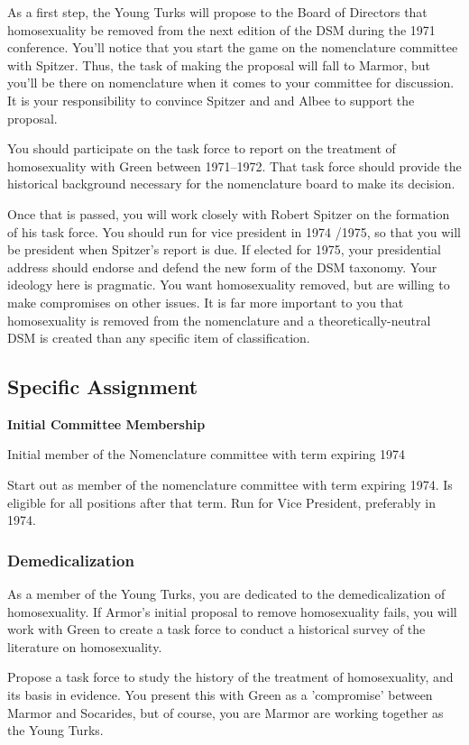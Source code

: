 \begin{refsection}
As a first step, the Young Turks will propose to the Board of Directors that homosexuality be removed from the next edition of the DSM during the 1971 conference. You'll notice that you start the game on the nomenclature committee with Spitzer. Thus, the task of making the proposal will fall to Marmor, but you'll be there on nomenclature when it comes to your committee for discussion. It is your responsibility to convince Spitzer and and Albee to support the proposal.

You should participate on the task force to report on the treatment of homosexuality with Green between 1971--1972. That task force should provide the historical background necessary for the nomenclature board to make its decision.

Once that is passed, you will work closely with Robert Spitzer on the formation of his task force. You should run for vice president in 1974 \slash  1975, so that you will be president when Spitzer's report is due. If elected for 1975, your presidential address should endorse and defend the new form of the DSM taxonomy. Your ideology here is pragmatic. You want homosexuality removed, but are willing to make compromises on other issues. It is far more important to you that homosexuality is removed from the nomenclature and a theoretically-neutral DSM is created than any specific item of classification.

\subsection{Specific Assignment}
\label{specificassignment}

\textbf{Initial Committee Membership}
\begin{service}[Spiegel]\label{service:spiegel}
Initial member of the Nomenclature committee with term expiring 1974
\end{service}

Start out as member of the nomenclature committee with term expiring 1974. Is eligible for all positions after that term. Run for Vice President, preferably in 1974.

\subsubsection{Demedicalization}
\label{demedicalization}

As a member of the Young Turks, you are dedicated to the demedicalization of homosexuality. If Armor’s initial proposal to remove homosexuality fails, you will work with Green to create a task force to conduct a historical survey of the literature on homosexuality. \begin{proposal}[Spiegel]\label{proposal:spiegel}
Propose a task force to study the history of the treatment of homosexuality, and its basis in evidence.  You present this with Green as a 'compromise' between Marmor and Socarides, but of course, you are Marmor are working together as the Young Turks.
\end{proposal}


\end{refsection}
